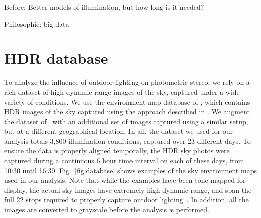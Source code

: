 \documentclass{report}
\begin{document}
Before: Better models of illumination, but how long is it needed?

Philosophie: big-data

\section{HDR database}



To analyze the influence of outdoor lighting on photometric stereo, we rely on a rich dataset of high dynamic range images of the sky, captured under a wide variety of conditions. We use the environment map database of \cite{lalonde-3dv-14}, which contains HDR images of the sky captured using the approach described in \cite{stumpfel-afrigraph-04}. We augment the dataset of~\cite{lalonde-3dv-14} with an additional set of images captured using a similar setup, but at a different geographical location. In all, the dataset we used for our analysis totals 3,800 illumination conditions, captured over 23 different days. To ensure the data is properly aligned temporally, the HDR sky photos were captured during a continuous 6 hour time interval on each of these days, from 10:30 until 16:30. Fig.~\ref{fig:database} shows examples of the sky environment maps used in our analysis. Note that while the examples have been tone mapped for display, the actual sky images have extremely high dynamic range, and span the full 22 stops required to properly capture outdoor lighting~\cite{stumpfel-afrigraph-04}. In addition, all the images are converted to grayscale before the analysis is performed.
\end{document}
